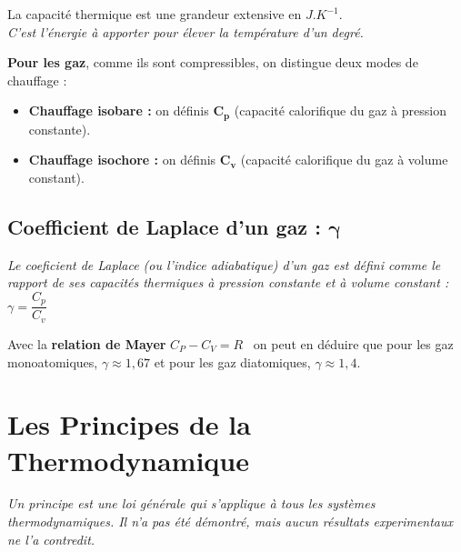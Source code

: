 \documentclass[a4paper,12pt]{article}
\begin{document}
    La capacité thermique est une grandeur extensive en $J.K^{-1}$.\\
    \textit{C'est l'énergie à apporter pour élever la température d'un degré.}
    \vspace{3mm}

    \textbf{Pour les gaz}, comme ils sont compressibles, on distingue deux modes de chauffage :
    \vspace{3pt}
    \begin{itemize}[label=\textbullet]
        \item \textbf{Chauffage isobare :} on définis $\bm{C_p}$ (capacité calorifique du gaz à pression constante).
        \item \textbf{Chauffage isochore :} on définis $\bm{C_v}$ (capacité calorifique du gaz à volume constant).
    \end{itemize}

    \subsection*{Coefficient de Laplace d'un gaz : $\bm{\gamma}$}

    \textit{Le coeficient de Laplace (ou l'indice adiabatique) d'un gaz est défini comme le rapport de
    ses capacités thermiques à pression constante et à volume constant :} $\boxed{\gamma = \dfrac{C_p}{C_v}}$

    Avec la \textbf{relation de Mayer} $C_P - C_V = R$ \ on peut en déduire que pour les gaz monoatomiques, $\gamma \approx 1,67$ et pour les gaz diatomiques, $\gamma \approx 1,4$.




\section{Les Principes de la Thermodynamique}

    \textit{Un principe est une loi générale qui s'applique à tous les systèmes thermodynamiques. Il n'a pas été démontré, mais aucun résultats experimentaux ne l'a contredit.}
\end{document}
